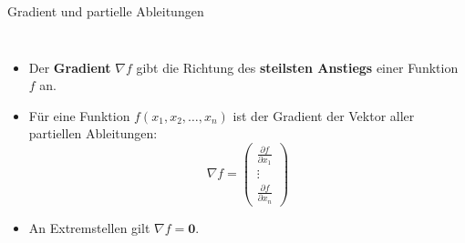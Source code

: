 \begin{frame}{Gradient und partielle Ableitungen}

\begin{columns}

\begin{itemize}
    \item Der \textbf{Gradient} $\nabla f$ gibt die Richtung des
          \textbf{steilsten Anstiegs} einer Funktion $f$ an.

    \item Für eine Funktion
          $f(x_1,x_2,\dots,x_n)$ ist der Gradient der Vektor aller
          partiellen Ableitungen:
          \[
          \nabla f =
          \begin{pmatrix}
          \frac{\partial f}{\partial x_1}\\
          \vdots\\
          \frac{\partial f}{\partial x_n}
          \end{pmatrix}
          \]

    \item An Extremstellen gilt $\nabla f = \mathbf{0}$.
\end{itemize}


\centering
\vspace{-1.5cm}




\end{columns}

\end{frame}

